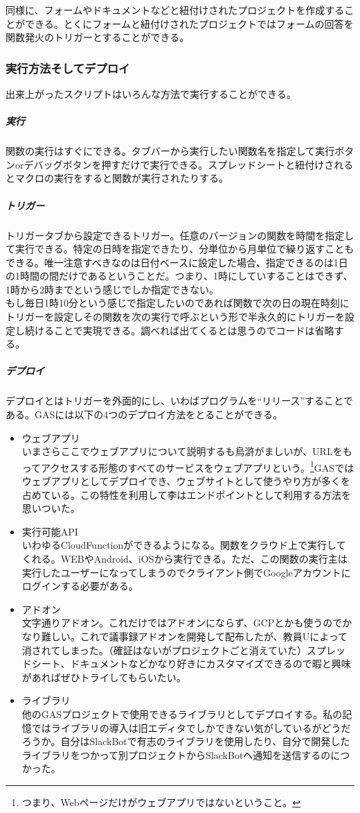 \documentclass[dvipdfmx,jb5]{jreport}
\begin{document}
同様に、フォームやドキュメントなどと紐付けされたプロジェクトを作成することができる。とくにフォームと紐付けされたプロジェクトではフォームの回答を関数発火のトリガーとすることができる。

\subsubsection{実行方法そしてデプロイ}
出来上がったスクリプトはいろんな方法で実行することができる。
\subparagraph{実行}
関数の実行はすぐにできる。タブバーから実行したい関数名を指定して実行ボタンorデバッグボタンを押すだけで実行できる。スプレッドシートと紐付けされるとマクロの実行をすると関数が実行されたりする。

\subparagraph{トリガー}
トリガータブから設定できるトリガー。任意のバージョンの関数を時間を指定して実行できる。特定の日時を指定できたり、分単位から月単位で繰り返すこともできる。唯一注意すべきなのは日付ベースに設定した場合、指定できるのは1日の1時間の間だけであるということだ。つまり、1時にしていすることはできず、1時から2時までという感じでしか指定できない。
\\

もし毎日1時10分という感じで指定したいのであれば関数で次の日の現在時刻にトリガーを設定しその関数を次の実行で呼ぶという形で半永久的にトリガーを設定し続けることで実現できる。調べれば出てくるとは思うのでコードは省略する。

\subparagraph{デプロイ}
デプロイとはトリガーを外面的にし、いわばプログラムを``リリース''することである。GASには以下の4つのデプロイ方法をとることができる。
\begin{itemize}
      \item ウェブアプリ\\
            いまさらここでウェブアプリについて説明するも烏滸がましいが、URLをもってアクセスする形態のすべてのサービスをウェブアプリという。\footnote{つまり、Webページだけがウェブアプリではないということ。}GASではウェブアプリとしてデプロイでき、ウェブサイトとして使うやり方が多くを占めている。この特性を利用して李はエンドポイントとして利用する方法を思いついた。
      \item 実行可能API\\
            いわゆるCloudFunctionができるようになる。関数をクラウド上で実行してくれる。WEBやAndroid、iOSから実行できる。ただ、この関数の実行主は実行したユーザーになってしまうのでクライアント側でGoogleアカウントにログインする必要がある。
      \item アドオン\\
            文字通りアドオン。これだけではアドオンにならず、GCPとかも使うのでかなり難しい。これで議事録アドオンを開発して配布したが、教員Uによって消されてしまった。（確証はないがプロジェクトごと消えていた）スプレッドシート、ドキュメントなどかなり好きにカスタマイズできるので暇と興味があればぜひトライしてもらいたい。
      \item ライブラリ\\
            他のGASプロジェクトで使用できるライブラリとしてデプロイする。私の記憶ではライブラリの導入は旧エディタでしかできない気がしているがどうだろうか。自分はSlackBotで有志のライブラリを使用したり、自分で開発したライブラリをつかって別プロジェクトからSlackBotへ通知を送信するのにつかった。
\end{itemize}
\end{document}
